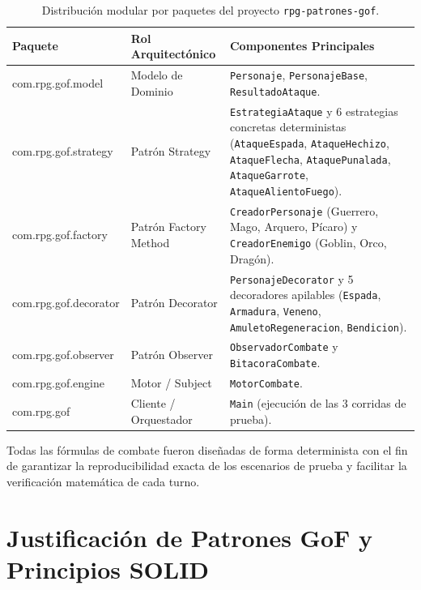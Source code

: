 \documentclass[12pt,letterpaper]{article}
\begin{document}
\begin{table}[H]
    \centering
    \caption{Distribución modular por paquetes del proyecto \texttt{rpg-patrones-gof}.}
    \label{tab:paquetes}
    \begin{tabular}{>{\ttfamily}l l p{6.8cm}}
        \toprule
        \normalfont\textbf{Paquete} & \textbf{Rol Arquitectónico} & \textbf{Componentes Principales} \\
        \midrule
        com.rpg.gof.model     & Modelo de Dominio   & \texttt{Personaje}, \texttt{PersonajeBase}, \texttt{ResultadoAtaque}. \\
        com.rpg.gof.strategy  & Patrón Strategy     & \texttt{EstrategiaAtaque} y 6 estrategias concretas deterministas (\texttt{AtaqueEspada}, \texttt{AtaqueHechizo}, \texttt{AtaqueFlecha}, \texttt{AtaquePunalada}, \texttt{AtaqueGarrote}, \texttt{AtaqueAlientoFuego}). \\
        com.rpg.gof.factory   & Patrón Factory Method & \texttt{CreadorPersonaje} (Guerrero, Mago, Arquero, Pícaro) y \texttt{CreadorEnemigo} (Goblin, Orco, Dragón). \\
        com.rpg.gof.decorator & Patrón Decorator    & \texttt{PersonajeDecorator} y 5 decoradores apilables (\texttt{Espada}, \texttt{Armadura}, \texttt{Veneno}, \texttt{AmuletoRegeneracion}, \texttt{Bendicion}). \\
        com.rpg.gof.observer  & Patrón Observer     & \texttt{ObservadorCombate} y \texttt{BitacoraCombate}. \\
        com.rpg.gof.engine    & Motor / Subject     & \texttt{MotorCombate}. \\
        com.rpg.gof           & Cliente / Orquestador & \texttt{Main} (ejecución de las 3 corridas de prueba). \\
        \bottomrule
    \end{tabular}
\end{table}

Todas las fórmulas de combate fueron diseñadas de forma determinista con el fin de garantizar la reproducibilidad exacta de los escenarios de prueba y facilitar la verificación matemática de cada turno.

\section{Justificación de Patrones GoF y Principios SOLID}
\end{document}
